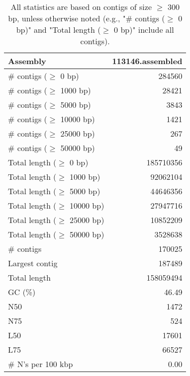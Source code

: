 \documentclass[12pt,a4paper]{article}
\begin{document}
\begin{table}[ht]
\begin{center}
\caption{All statistics are based on contigs of size $\geq$ 300 bp, unless otherwise noted (e.g., "\# contigs ($\geq$ 0 bp)" and "Total length ($\geq$ 0 bp)" include all contigs).}
\begin{tabular}{|l*{1}{|r}|}
\hline
Assembly & 113146.assembled \\ \hline
\# contigs ($\geq$ 0 bp) & 284560 \\ \hline
\# contigs ($\geq$ 1000 bp) & 28421 \\ \hline
\# contigs ($\geq$ 5000 bp) & 3843 \\ \hline
\# contigs ($\geq$ 10000 bp) & 1421 \\ \hline
\# contigs ($\geq$ 25000 bp) & 267 \\ \hline
\# contigs ($\geq$ 50000 bp) & 49 \\ \hline
Total length ($\geq$ 0 bp) & 185710356 \\ \hline
Total length ($\geq$ 1000 bp) & 92062104 \\ \hline
Total length ($\geq$ 5000 bp) & 44646356 \\ \hline
Total length ($\geq$ 10000 bp) & 27947716 \\ \hline
Total length ($\geq$ 25000 bp) & 10852209 \\ \hline
Total length ($\geq$ 50000 bp) & 3528638 \\ \hline
\# contigs & 170025 \\ \hline
Largest contig & 187489 \\ \hline
Total length & 158059494 \\ \hline
GC (\%) & 46.49 \\ \hline
N50 & 1472 \\ \hline
N75 & 524 \\ \hline
L50 & 17601 \\ \hline
L75 & 66527 \\ \hline
\# N's per 100 kbp & 0.00 \\ \hline
\end{tabular}
\end{center}
\end{table}
\end{document}
